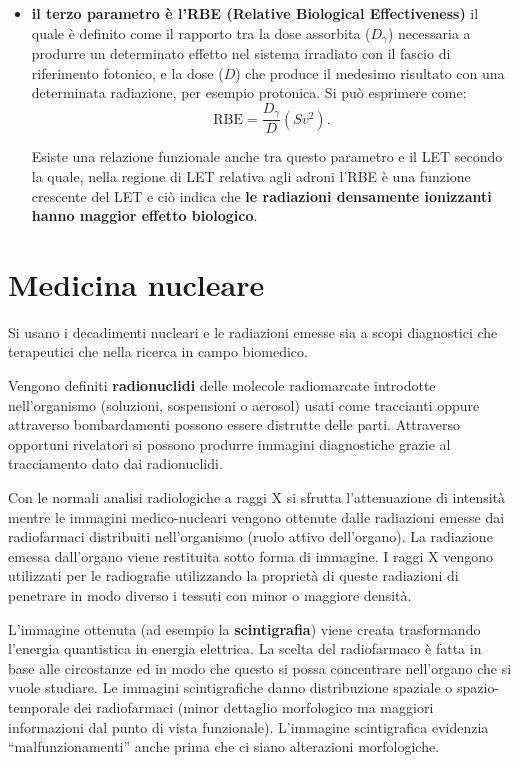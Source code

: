 \documentclass[a4paper,11pt,twoside,openany]{book}
\theoremstyle{definition}
\theoremstyle{plain}
\theoremstyle{plain}
\theoremstyle{definition}
\begin{document}
\begin{itemize}
\item \textbf{il terzo parametro è l'RBE (Relative Biological Effectiveness)} il quale è definito come il rapporto tra la dose assorbita ($D_{\gamma}$) necessaria a produrre un determinato effetto nel sistema irradiato con il fascio di riferimento fotonico, e la dose ($D$) che produce il medesimo risultato con una determinata radiazione, per esempio protonica. Si può esprimere come: 
\begin{equation}
\textrm{RBE}= \frac{D_{\gamma}}{D} (\si{Sv^2}).
\end{equation}

Esiste una relazione funzionale anche tra questo parametro e il LET secondo la quale, nella regione di LET relativa agli adroni l'RBE è una funzione crescente del LET e ciò indica che \textbf{le radiazioni densamente ionizzanti hanno maggior effetto biologico}.
\end{itemize}

\section{Medicina nucleare} %
Si usano i decadimenti nucleari e le radiazioni emesse sia a scopi diagnostici che terapeutici che nella ricerca in campo biomedico.

Vengono definiti \textbf{radionuclidi} delle molecole radiomarcate introdotte nell'organismo (soluzioni, sospensioni o aerosol) usati come traccianti oppure attraverso bombardamenti possono essere distrutte delle parti. Attraverso opportuni rivelatori si possono produrre immagini diagnostiche grazie al tracciamento dato dai radionuclidi.

Con le normali analisi radiologiche a raggi X si sfrutta l'attenuazione di intensità mentre le immagini medico-nucleari vengono ottenute dalle radiazioni emesse dai radiofarmaci distribuiti nell'organismo (ruolo attivo dell'organo). La radiazione emessa dall'organo viene restituita sotto forma di immagine. I raggi X vengono utilizzati per le radiografie utilizzando la proprietà di queste radiazioni di penetrare in modo diverso i tessuti con minor o maggiore densità.

L'immagine ottenuta (ad esempio la \textbf{scintigrafia}) viene creata trasformando l'energia quantistica in energia elettrica. La scelta del radiofarmaco è fatta in base alle circostanze ed in modo che questo si possa concentrare nell'organo che si vuole studiare. Le immagini scintigrafiche danno distribuzione spaziale o spazio-temporale dei radiofarmaci (minor dettaglio morfologico ma maggiori informazioni dal punto di vista funzionale). L'immagine scintigrafica evidenzia ``malfunzionamenti'' anche prima che ci siano alterazioni morfologiche.
\end{document}
